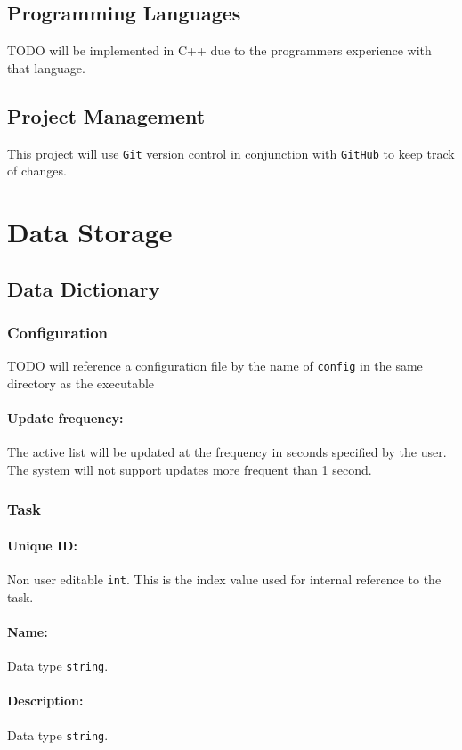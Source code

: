 \documentclass[12pt]{article}
\newcommand{\e}[1] {{\tt #1}}
\begin{document}
\subsection{Programming Languages}
TODO will be implemented in C++ due to the programmers experience with that language.

\subsection{Project Management}
This project will use {\tt Git} version control in conjunction with {\tt GitHub} to keep track of changes.

\section{Data Storage}\label{sec:Data Storage}
\subsection{Data Dictionary}\label{sec:Data Dictionary}
\subsubsection{Configuration} \label{sec:Configuration}
 TODO will reference a configuration file by the name of \e{config} in the same directory as the executable 
\paragraph{Update frequency:} \label{sec:Update timing} The active list will be updated at the frequency in seconds specified by the user. The system will not support updates more frequent than 1 second.

\subsubsection{Task} \label{sec:Task}
\paragraph{Unique ID:} Non user editable \e{int}. This is the index value used for internal reference to the task. 
\paragraph{Name:} Data type \e{string}.
\paragraph{Description:} Data type \e{string}.
\end{document}
